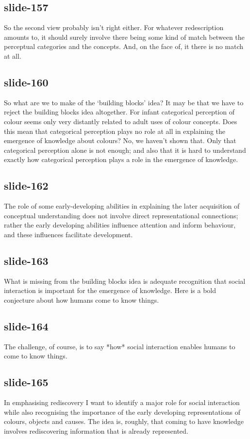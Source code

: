 \documentclass[12pt,\papersize]{extarticle}
\begin{document}
 
\subsection{slide-157}
So the second view probably isn't right either.
For whatever redescription amounts to, it should surely involve there being some kind of match between the perceptual categories and the concepts.
And, on the face of, it there is no match at all.
 
 
\subsection{slide-160}
So what are we to make of the ‘building blocks’ idea?
It may be that we have to reject the building blocks idea altogether.
For infant categorical perception of colour seems only very distantly related to adult uses of colour concepts.
Does this mean that categorical perception plays no role at all in explaining the emergence of knowledge about colours?
No, we haven't shown that. Only that categorical perception alone is not enough; and also that it is hard to understand exactly how categorical perception plays a role in the emergence of knowledge.
 
 
\subsection{slide-162}
The role of some early-developing abilities in explaining the later acquisition of conceptual understanding does not involve direct representational connections; rather the early developing abilities influence attention and inform behaviour, and these influences facilitate development.
 
 
\subsection{slide-163}
What is missing from the building blocks idea is adequate recognition that social interaction is important for the emergence of knowledge.
Here is a bold conjecture about how humans come to know things.
 
 
\subsection{slide-164}
The challenge, of course, is to say *how* social interaction enables humans to come to know things.
 
 
\subsection{slide-165}
In emphasising rediscovery I want to identify a major role for social interaction while also recognising the importance of the early developing representations of colours, objects and causes.
The idea is, roughly, that coming to have knowledge involves rediscovering information that is already represented.
 
\end{document}
